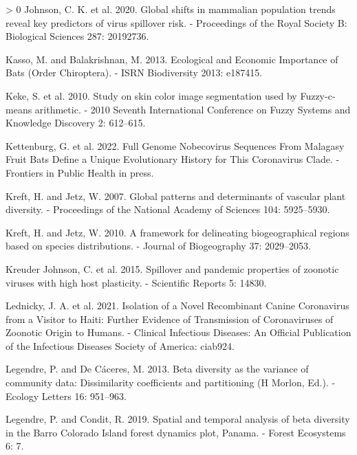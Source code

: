 \documentclass[11pt]{article}
\newlength{\cslhangindent}
\newenvironment{CSLReferences}[3] %
 {%
  \setlength{\parindent}{0pt}
  \ifodd #1 \everypar{\setlength{\hangindent}{\cslhangindent}}\ignorespaces\fi
  \ifnum #2 > 0
  \setlength{\parskip}{#2\baselineskip}
  \fi
 }%
 {}
\begin{document}
\begin{CSLReferences}{1}{0}
\leavevmode\hypertarget{ref-Johnson2020GloShi}{}%
Johnson, C. K. et al. 2020. Global shifts in mammalian population trends
reveal key predictors of virus spillover risk. - Proceedings of the
Royal Society B: Biological Sciences 287: 20192736.

\leavevmode\hypertarget{ref-Kasso2013EcoEco}{}%
Kasso, M. and Balakrishnan, M. 2013. Ecological and Economic Importance
of Bats (Order Chiroptera). - ISRN Biodiversity 2013: e187415.

\leavevmode\hypertarget{ref-Keke2010StuSki}{}%
Keke, S. et al. 2010. Study on skin color image segmentation used by
Fuzzy-c-means arithmetic. - 2010 Seventh International Conference on
Fuzzy Systems and Knowledge Discovery 2: 612--615.

\leavevmode\hypertarget{ref-Kettenburg2022FulGen}{}%
Kettenburg, G. et al. 2022. Full Genome Nobecovirus Sequences From
Malagasy Fruit Bats Define a Unique Evolutionary History for This
Coronavirus Clade. - Frontiers in Public Health in press.

\leavevmode\hypertarget{ref-Kreft2007GloPat}{}%
Kreft, H. and Jetz, W. 2007. Global patterns and determinants of
vascular plant diversity. - Proceedings of the National Academy of
Sciences 104: 5925--5930.

\leavevmode\hypertarget{ref-Kreft2010FraDel}{}%
Kreft, H. and Jetz, W. 2010. A framework for delineating biogeographical
regions based on species distributions. - Journal of Biogeography 37:
2029--2053.

\leavevmode\hypertarget{ref-KreuderJohnson2015SpiPan}{}%
Kreuder Johnson, C. et al. 2015. Spillover and pandemic properties of
zoonotic viruses with high host plasticity. - Scientific Reports 5:
14830.

\leavevmode\hypertarget{ref-Lednicky2021IsoNov}{}%
Lednicky, J. A. et al. 2021. Isolation of a Novel Recombinant Canine
Coronavirus from a Visitor to Haiti: Further Evidence of Transmission of
Coronaviruses of Zoonotic Origin to Humans. - Clinical Infectious
Diseases: An Official Publication of the Infectious Diseases Society of
America: ciab924.

\leavevmode\hypertarget{ref-Legendre2013BetDiv}{}%
Legendre, P. and De Cáceres, M. 2013. Beta diversity as the variance of
community data: Dissimilarity coefficients and partitioning (H Morlon,
Ed.). - Ecology Letters 16: 951--963.

\leavevmode\hypertarget{ref-Legendre2019SpaTem}{}%
Legendre, P. and Condit, R. 2019. Spatial and temporal analysis of beta
diversity in the Barro Colorado Island forest dynamics plot, Panama. -
Forest Ecosystems 6: 7.


\end{CSLReferences}
\end{document}
